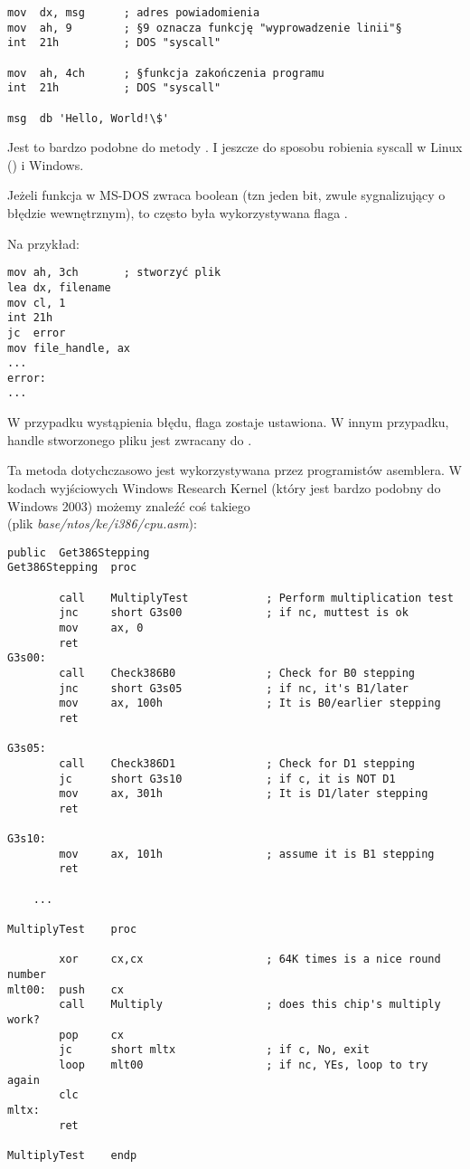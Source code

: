\begin{lstlisting}[style=customasmx86]
mov  dx, msg      ; adres powiadomienia
mov  ah, 9        ; §9 oznacza funkcję "wyprowadzenie linii"§
int  21h          ; DOS "syscall"

mov  ah, 4ch      ; §funkcja zakończenia programu
int  21h          ; DOS "syscall"

msg  db 'Hello, World!\$'
\end{lstlisting}

Jest to bardzo podobne do metody .
I jeszcze do sposobu robienia syscall w Linux () i Windows.

Jeżeli funkcja w MS-DOS zwraca boolean (tzn jeden bit, zwule sygnalizujący o błędzie wewnętrznym),
to często była wykorzystywana flaga .

Na przykład:

\begin{lstlisting}[style=customasmx86]
mov ah, 3ch       ; stworzyć plik
lea dx, filename
mov cl, 1
int 21h
jc  error
mov file_handle, ax
...
error:
...
\end{lstlisting}

W przypadku wystąpienia błędu, flaga  zostaje ustawiona.
W innym przypadku, handle stworzonego pliku jest zwracany do .

Ta metoda dotychczasowo jest wykorzystywana przez programistów asemblera.
W kodach wyjściowych Windows Research Kernel (który jest bardzo podobny do Windows 2003) możemy znaleźć coś takiego\\
(plik \emph{base/ntos/ke/i386/cpu.asm}):

\begin{lstlisting}[style=customasmx86]
        public  Get386Stepping
Get386Stepping  proc

        call    MultiplyTest            ; Perform multiplication test
        jnc     short G3s00             ; if nc, muttest is ok
        mov     ax, 0
        ret
G3s00:
        call    Check386B0              ; Check for B0 stepping
        jnc     short G3s05             ; if nc, it's B1/later
        mov     ax, 100h                ; It is B0/earlier stepping
        ret

G3s05:
        call    Check386D1              ; Check for D1 stepping
        jc      short G3s10             ; if c, it is NOT D1
        mov     ax, 301h                ; It is D1/later stepping
        ret

G3s10:
        mov     ax, 101h                ; assume it is B1 stepping
        ret

	...

MultiplyTest    proc

        xor     cx,cx                   ; 64K times is a nice round number
mlt00:  push    cx
        call    Multiply                ; does this chip's multiply work?
        pop     cx
        jc      short mltx              ; if c, No, exit
        loop    mlt00                   ; if nc, YEs, loop to try again
        clc
mltx:
        ret

MultiplyTest    endp
\end{lstlisting}



